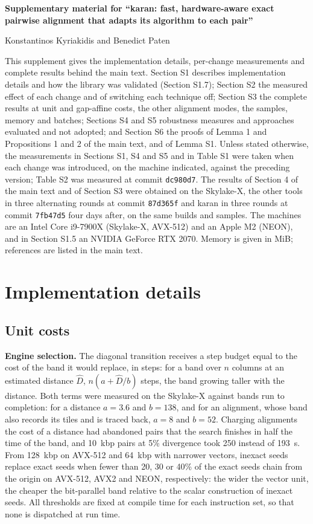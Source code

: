 \documentclass[10pt]{article}
\begin{document}
{\Large\bfseries Supplementary material for ``karan: fast, hardware-aware exact pairwise alignment that adapts its algorithm to each pair''\par}\medskip
{\large Konstantinos Kyriakidis and Benedict Paten}\par\bigskip
This supplement gives the implementation details, per-change measurements and complete results behind the main text. Section S1 describes implementation details and how the library was validated (Section S1.7); Section S2 the measured effect of each change and of switching each technique off; Section S3 the complete results at unit and gap-affine costs, the other alignment modes, the samples, memory and batches; Sections S4 and S5 robustness measures and approaches evaluated and not adopted; and Section S6 the proofs of Lemma 1 and Propositions 1 and 2 of the main text, and of Lemma S1. Unless stated otherwise, the measurements in Sections S1, S4 and S5 and in Table S1 were taken when each change was introduced, on the machine indicated, against the preceding version; Table S2 was measured at commit \texttt{dc980d7}. The results of Section 4 of the main text and of Section S3 were obtained on the Skylake-X, the other tools in three alternating rounds at commit \texttt{87d365f} and karan in three rounds at commit \texttt{7fb47d5} four days after, on the same builds and samples. The machines are an Intel Core i9-7900X (Skylake-X, AVX-512) and an Apple M2 (NEON), and in Section S1.5 an NVIDIA GeForce RTX 2070. Memory is given in MiB; references are listed in the main text.

\section{Implementation details}

\subsection{Unit costs}

\textbf{Engine selection.} The diagonal transition receives a step budget equal to the cost of the band it would replace, in steps: for a band over \(n\) columns at an estimated distance \(\hat D\), \(n(a + \hat D/b)\) steps, the band growing taller with the distance. Both terms were measured on the Skylake-X against bands run to completion: for a distance \(a = 3.6\) and \(b = 138\), and for an alignment, whose band also records its tiles and is traced back, \(a = 8\) and \(b = 52\). Charging alignments the cost of a distance had abandoned pairs that the search finishes in half the time of the band, and 10~kbp pairs at 5\% divergence took 250 instead of 193~\textmu s. From 128~kbp on AVX-512 and 64~kbp with narrower vectors, inexact seeds replace exact seeds when fewer than 20, 30 or 40\% of the exact seeds chain from the origin on AVX-512, AVX2 and NEON, respectively: the wider the vector unit, the cheaper the bit-parallel band relative to the scalar construction of inexact seeds. All thresholds are fixed at compile time for each instruction set, so that none is dispatched at run time.
\end{document}
